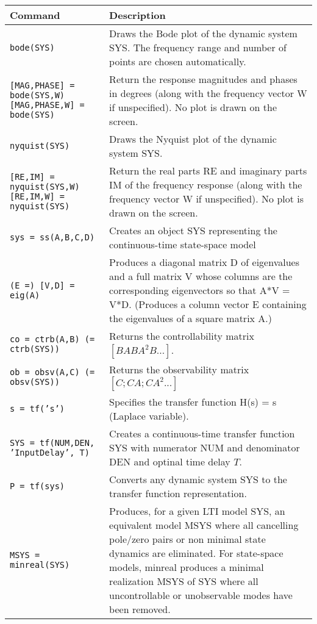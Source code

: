 \begin{center}
    \def\arraystretch{1.5}
    \begin{tabular}{p{5cm}|p{8cm}}
        \textbf{Command}    &   \textbf{Description}\\
        \hline
        \texttt{bode(SYS)}  &  Draws the Bode plot of the dynamic system SYS. The frequency range and number of points are chosen automatically.\\
        \texttt{[MAG,PHASE] = bode(SYS,W) [MAG,PHASE,W] = bode(SYS)} & Return the response magnitudes and phases in degrees (along with the frequency vector W if unspecified).  No plot is drawn on the screen. \\
        \texttt{nyquist(SYS)}  &  Draws the Nyquist plot of the dynamic system SYS. \\
        \texttt{[RE,IM] = nyquist(SYS,W) [RE,IM,W] = nyquist(SYS)} & Return the real parts RE and imaginary parts IM of the frequency response (along with the frequency vector W if unspecified).  No plot is drawn on the screen. \\
        \texttt{sys = ss(A,B,C,D)}  & Creates an object SYS representing the continuous-time state-space model \\
        \texttt{(E =) [V,D] = eig(A)}  &  Produces a diagonal matrix D of eigenvalues and a full matrix V whose columns are the corresponding eigenvectors so that A*V = V*D. (Produces a column vector E containing the eigenvalues of a square matrix A.)\\
        \texttt{co = ctrb(A,B) (= ctrb(SYS))}  & Returns the controllability matrix $[B AB A^2B ...]$.  \\
        \texttt{ob = obsv(A,C) (= obsv(SYS))}  & Returns the observability matrix $[C; CA; CA^2 ...]$ \\
        \texttt{s = tf('s')}  & Specifies the transfer function H(s) = s (Laplace variable). \\
        \texttt{SYS = tf(NUM,DEN, 'InputDelay', T)} & Creates a continuous-time transfer function SYS with numerator NUM and denominator DEN and optinal time delay $T$.\\
        \texttt{P = tf(sys)}  & Converts any dynamic system SYS to the transfer function representation. \\
        \texttt{MSYS = minreal(SYS)}  &  Produces, for a given LTI model SYS, an equivalent model MSYS where all cancelling pole/zero pairs or non minimal state dynamics are eliminated.  For state-space models, minreal produces a minimal realization MSYS of SYS where all uncontrollable or unobservable modes have been removed.\\

\end{tabular}
\end{center}
